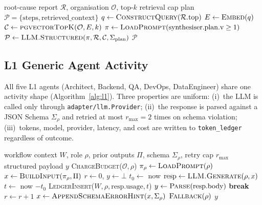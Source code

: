 \documentclass[manuscript,nonacm=true,screen=false,review=false]{acmart}
\begin{document}
\begin{algorithm}
\caption{L2 Synthesiser.Plan --- retrieval-augmented planning}\label{alg:synth}
\begin{algorithmic}[1]
\Require root-cause report $\mathcal{R}$, organisation $\mathcal{O}$, top-$k$ retrieval cap
\Ensure plan $\mathcal{P} = \{\text{steps}, \text{retrieved\_context}\}$
\State $q \gets \textsc{ConstructQuery}(\mathcal{R}.\text{top})$
\State $E \gets \textsc{Embed}(q)$
\State $\mathcal{C} \gets \textsc{pgvectorTopK}(\mathcal{O}, E, k)$ 
\State $\pi \gets \textsc{LoadPrompt}(\text{synthesiser.plan.v}\geq 1)$
\State $\mathcal{P} \gets \textsc{LLM.Structured}(\pi, \mathcal{R}, \mathcal{C}, \Sigma_{\text{plan}})$
\State \Return $\mathcal{P}$
\end{algorithmic}
\end{algorithm}

\subsection{L1 Generic Agent Activity}

All five L1 agents (Architect, Backend, QA, DevOps, DataEngineer) share one activity shape (Algorithm~\ref{alg:l1}). Three properties are uniform: (i)~the LLM is called only through \texttt{adapter/llm.Provider}; (ii)~the response is parsed against a JSON Schema $\Sigma_\rho$ and retried at most $r_{\max}=2$ times on schema violation; (iii)~tokens, model, provider, latency, and cost are written to \texttt{token\_ledger} regardless of outcome.

\begin{algorithm}
\caption{L1 generic agent activity (\(\rho\in\)\{Architect, Backend, QA, DevOps, DataEng\})}\label{alg:l1}
\begin{algorithmic}[1]
\Require workflow context $W$, role $\rho$, prior outputs $\Pi$, schema $\Sigma_\rho$, retry cap $r_{\max}$
\Ensure structured payload $y$
\State \textsc{ChargeBudget}($\mathcal{O}, \rho$) 
\State $\pi_\rho \gets \textsc{LoadPrompt}(\rho)$
\State $x \gets \textsc{BuildInput}(\pi_\rho, \Pi)$
\State $r \gets 0$, $y \gets \bot$
  \State $t_0 \gets$ now
  \State $\text{resp} \gets \textsc{LLM.Generate}(\rho, x)$
  \State $t \gets$ now $- t_0$
  \State \textsc{LedgerInsert}($W, \rho, \text{resp.usage}, t$)
    \State $y \gets \textsc{Parse}(\text{resp.body})$
    \State \textbf{break}
  \EndIf
  \State $r \gets r + 1$
  \State $x \gets \textsc{AppendSchemaErrorHint}(x, \Sigma_\rho)$
\EndWhile
{}
  \State \Return $\textsc{Fallback}(\rho)$ 
\EndIf
\State \Return $y$
\end{algorithmic}
\end{algorithm}
\end{document}
